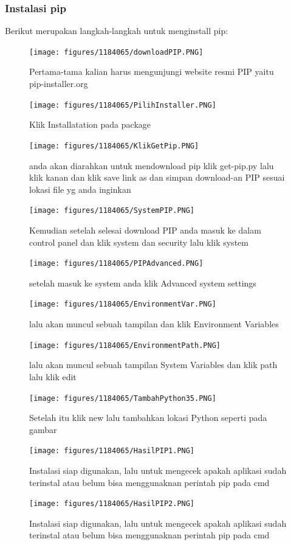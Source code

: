 \subsubsection{Instalasi pip}
Berikut merupakan langkah-langkah untuk menginstall pip:
	\begin{figure}[H]
		\texttt{[image: figures/1184065/downloadPIP.PNG]}
		\centering
		\caption{Pertama-tama kalian harus mengunjungi website resmi PIP yaitu pip-installer.org}
	\end{figure}
	\begin{figure}[H]
		\texttt{[image: figures/1184065/PilihInstaller.PNG]}
		\centering
		\caption{Klik Installatation pada package}
	\end{figure}
	\begin{figure}[H]
		\texttt{[image: figures/1184065/KlikGetPip.PNG]}
		\centering
		\caption{anda akan diarahkan untuk mendownload pip klik get-pip.py lalu klik kanan dan klik save link as dan simpan download-an PIP sesuai lokasi file yg anda inginkan}
	\end{figure}
	\begin{figure}[H]
		\texttt{[image: figures/1184065/SystemPIP.PNG]}
		\centering
		\caption{Kemudian setelah selesai download PIP anda masuk ke dalam control panel dan klik system dan security lalu klik system }
		\end{figure}
		\begin{figure}[H]
		\texttt{[image: figures/1184065/PIPAdvanced.PNG]}
		\centering
		\caption{setelah masuk ke system anda klik Advanced system settings}
	\end{figure}
	\begin{figure}[H]
		\texttt{[image: figures/1184065/EnvironmentVar.PNG]}
		\centering
		\caption{lalu akan muncul sebuah tampilan dan klik Environment Variables }
	\end{figure}
	\begin{figure}[H]
		\texttt{[image: figures/1184065/EnvironmentPath.PNG]}
		\centering
		\caption{lalu akan muncul sebuah tampilan System Variables dan klik path lalu klik edit}
	\end{figure}
	\begin{figure}[H]
		\texttt{[image: figures/1184065/TambahPython35.PNG]}
		\centering
		\caption{Setelah itu klik new lalu tambahkan lokasi Python seperti pada gambar}
	\end{figure}
	\begin{figure}[H]
		\texttt{[image: figures/1184065/HasilPIP1.PNG]}
		\centering
		\caption{Instalasi siap digunakan, lalu untuk mengecek apakah aplikasi sudah terinstal atau belum bisa menggunaknan perintah pip pada cmd}
	\end{figure}
	\begin{figure}[H]
		\texttt{[image: figures/1184065/HasilPIP2.PNG]}
		\centering
		\caption{Instalasi siap digunakan, lalu untuk mengecek apakah aplikasi sudah terinstal atau belum bisa menggunaknan perintah pip pada cmd}
	\end{figure}      
